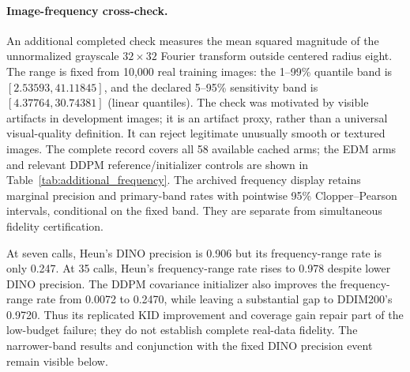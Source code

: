 \paragraph{Image-frequency cross-check.}
An additional completed check measures the mean squared magnitude of the
unnormalized grayscale $32\times32$ Fourier transform outside centered
radius eight. The range is fixed from 10,000 real training images:
the 1--99\% quantile band is $[2.53593,41.11845]$, and the declared
5--95\% sensitivity band is $[4.37764,30.74381]$ (linear quantiles).
The check was motivated by visible artifacts in development images;
it is an artifact proxy, rather than a universal visual-quality definition.
It can reject legitimate unusually smooth or textured images.
The complete record covers all 58 available cached arms; the EDM arms
and relevant DDPM reference/initializer controls are shown in
Table~\ref{tab:additional_frequency}. The archived frequency display retains marginal precision and primary-band
rates with pointwise 95\% Clopper--Pearson intervals, conditional on the fixed
band. They are separate from simultaneous fidelity certification.

At seven calls, Heun's DINO precision is 0.906 but its frequency-range
rate is only 0.247. At 35 calls, Heun's frequency-range rate rises to
0.978 despite lower DINO precision. The DDPM covariance initializer also
improves the frequency-range rate from 0.0072 to 0.2470, while leaving a
substantial gap to DDIM200's 0.9720. Thus its replicated KID improvement
and coverage gain repair part of the low-budget failure; they do not
establish complete real-data fidelity. The narrower-band results and
conjunction with the fixed DINO precision event remain visible below.

